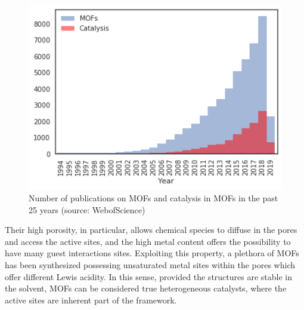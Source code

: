 \begin{figure}[htbp]
	\centering
 	\includegraphics[width=1.0\textwidth]{citation_report}
	\caption{Number of publications on MOFs and catalysis in MOFs in the past 25 years (source: WebofScience)}
	\label{fig:citation_report}
\end{figure}
Their high porosity, in particular, allows chemical species to diffuse in the pores and access the active sites, and the high metal content offers the possibility to have many guest interactions sites. Exploiting this property, a plethora of MOFs has been synthesized possessing unsaturated metal sites within the pores which offer different Lewis acidity. In this sense, provided the structures are stable in the solvent, MOFs can be considered true heterogeneous catalysts, where the active sites are inherent part of the framework. 

